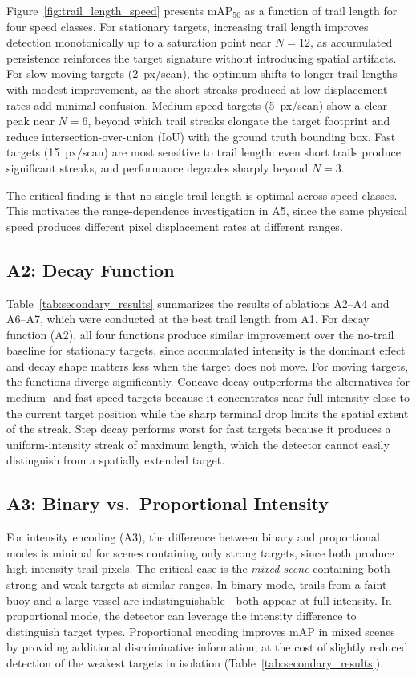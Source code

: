 \documentclass[colorlinks,upint,balance]{asmeconf}
\begin{document}
Figure~\ref{fig:trail_length_speed} presents mAP$_{50}$ as a function of trail length for four speed classes. For stationary targets, increasing trail length improves detection monotonically up to a saturation point near $N=12$, as accumulated persistence reinforces the target signature without introducing spatial artifacts. For slow-moving targets (2~px/scan), the optimum shifts to longer trail lengths with modest improvement, as the short streaks produced at low displacement rates add minimal confusion. Medium-speed targets (5~px/scan) show a clear peak near $N=6$, beyond which trail streaks elongate the target footprint and reduce intersection-over-union (IoU) with the ground truth bounding box. Fast targets (15~px/scan) are most sensitive to trail length: even short trails produce significant streaks, and performance degrades sharply beyond $N=3$.

The critical finding is that no single trail length is optimal across speed classes. This motivates the range-dependence investigation in A5, since the same physical speed produces different pixel displacement rates at different ranges.

\subsection{A2: Decay Function}

Table~\ref{tab:secondary_results} summarizes the results of ablations A2--A4 and A6--A7, which were conducted at the best trail length from A1. For decay function (A2), all four functions produce similar improvement over the no-trail baseline for stationary targets, since accumulated intensity is the dominant effect and decay shape matters less when the target does not move. For moving targets, the functions diverge significantly. Concave decay outperforms the alternatives for medium- and fast-speed targets because it concentrates near-full intensity close to the current target position while the sharp terminal drop limits the spatial extent of the streak. Step decay performs worst for fast targets because it produces a uniform-intensity streak of maximum length, which the detector cannot easily distinguish from a spatially extended target.

\subsection{A3: Binary vs.\ Proportional Intensity}

For intensity encoding (A3), the difference between binary and proportional modes is minimal for scenes containing only strong targets, since both produce high-intensity trail pixels. The critical case is the \textit{mixed scene} containing both strong and weak targets at similar ranges. In binary mode, trails from a faint buoy and a large vessel are indistinguishable---both appear at full intensity. In proportional mode, the detector can leverage the intensity difference to distinguish target types. Proportional encoding improves mAP in mixed scenes by providing additional discriminative information, at the cost of slightly reduced detection of the weakest targets in isolation (Table~\ref{tab:secondary_results}).
\end{document}

